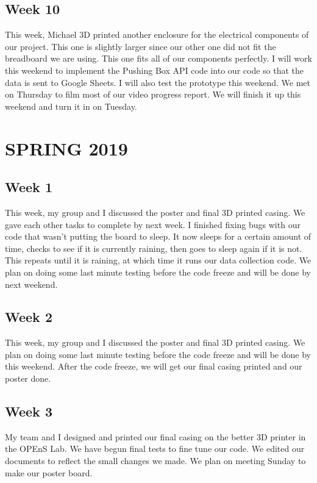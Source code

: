 \documentclass[letterpaper,10pt,draftclsnofoot,onecolumn]{article}
\begin{document}
\subsection{Week 10}
This week, Michael 3D printed another enclosure for the electrical components of our project. This one is slightly larger since our other one did not fit the breadboard we are using. This one fits all of our components perfectly. I will work this weekend to implement the Pushing Box API code into our code so that the data is sent to Google Sheets. I will also test the prototype this weekend. We met on Thursday to film most of our video progress report. We will finish it up this weekend and turn it in on Tuesday.

\section{SPRING 2019}

\subsection{Week 1}
This week, my group and I discussed the poster and final 3D printed casing. We gave each other tasks to complete by next week. I finished fixing bugs with our code that wasn't putting the board to sleep. It now sleeps for a certain amount of time, checks to see if it is currently raining, then goes to sleep again if it is not. This repeats until it is raining, at which time it runs our data collection code. We plan on doing some last minute testing before the code freeze and will be done by next weekend.
 
 
\subsection{Week 2}
This week, my group and I discussed the poster and final 3D printed casing. We plan on doing some last minute testing before the code freeze and will be done by this weekend. After the code freeze, we will get our final casing printed and our poster done. 
\subsection{Week 3}

My team and I designed and printed our final casing on the better 3D printer in the OPEnS Lab. We have begun final tests to fine tune our code. We edited our documents to reflect the small changes we made. We plan on meeting Sunday to make our poster board.
\end{document}
